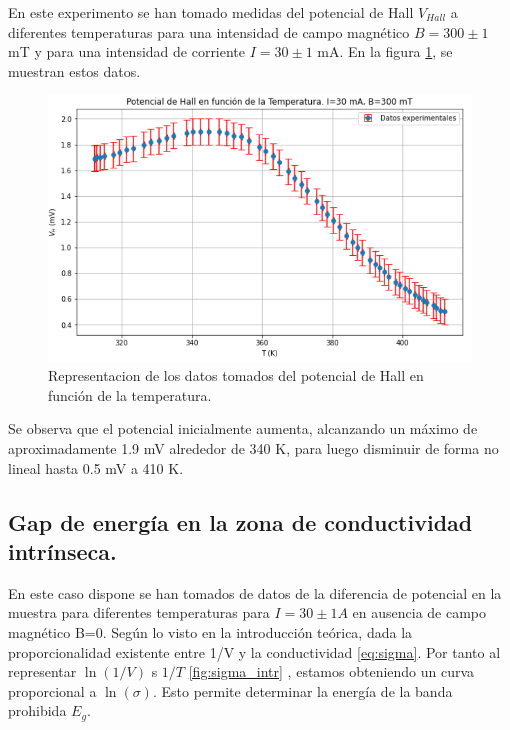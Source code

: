 	En este experimento se han tomado medidas del potencial de Hall $V_{Hall}$ a diferentes temperaturas para una intensidad de campo magnético $B=300\pm1$ mT y para una intensidad de corriente $I=30\pm1$ mA. En la figura \ref{fig:VH_T}, se muestran estos datos.
 	
	\begin{figure}[H]
		\centering
		\begin{minipage}{0.7\textwidth} 
			\includegraphics[width=\textwidth]{grafico_1x05_VH_temperatura.png}
			\caption{\footnotesize Representacion de los datos tomados del potencial de Hall en función de la temperatura.}
			\label{fig:VH_T}
		\end{minipage}
	\end{figure}
	
	Se observa que el potencial inicialmente aumenta, alcanzando un máximo de aproximadamente 1.9 mV alrededor de 340 K, para luego disminuir de forma no lineal hasta 0.5 mV a 410 K.
	
	\subsection{Gap de energía en la zona de conductividad intrínseca.}
	
	En este caso dispone se han tomados de datos de la diferencia de potencial en la muestra para diferentes temperaturas para $I=30\pm1 A$ en ausencia de campo magnético B=0. Según lo visto en la introducción teórica, dada la proporcionalidad existente entre 1/V y la conductividad \ref{eq:sigma}. Por tanto al representar  $\ln(1/V)$ s $1/T$ \ref{fig:sigma_intr} , estamos obteniendo un curva proporcional a $\ln(\sigma)$. Esto permite determinar la energía de la banda prohibida $E_g$.
	
